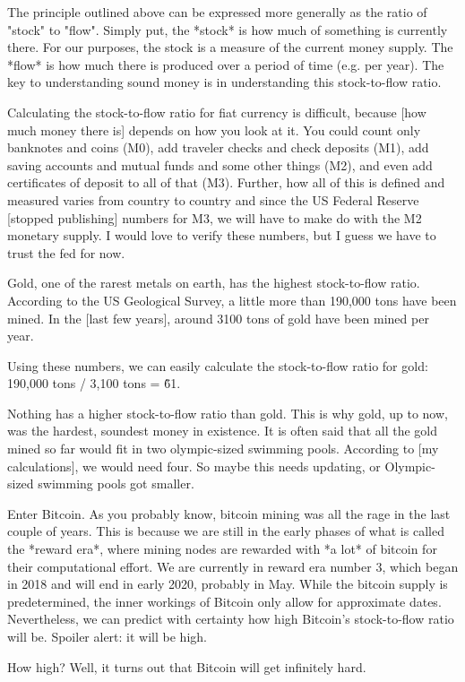 {{The principle outlined above can be expressed more generally as the
ratio of "stock" to "flow". Simply put, the *stock* is how much of
something is currently there. For our purposes, the stock is a measure
of the current money supply. The *flow* is how much there is produced
over a period of time (e.g. per year). The key to understanding sound
money is in understanding this stock-to-flow ratio.

Calculating the stock-to-flow ratio for fiat currency is difficult,
because [how much money there is] depends on how you look at it. You
could count only banknotes and coins (M0), add traveler checks and check
deposits (M1), add saving accounts and mutual funds and some other
things (M2), and even add certificates of deposit to all of that (M3).
Further, how all of this is defined and measured varies from country to
country and since the US Federal Reserve [stopped publishing] numbers
for M3, we will have to make do with the M2 monetary supply. I would
love to verify these numbers, but I guess we have to trust the fed for
now.

Gold, one of the rarest metals on earth, has the highest stock-to-flow
ratio. According to the US Geological Survey, a little more than 190,000
tons have been mined. In the [last few years], around 3100 tons of gold
have been mined per year.

Using these numbers, we can easily calculate the stock-to-flow ratio for
gold: 190,000 tons / 3,100 tons = \~61.

Nothing has a higher stock-to-flow ratio than gold. This is why gold, up
to now, was the hardest, soundest money in existence. It is often said
that all the gold mined so far would fit in two olympic-sized swimming
pools. According to [my calculations], we would need four. So maybe this
needs updating, or Olympic-sized swimming pools got smaller.

Enter Bitcoin. As you probably know, bitcoin mining was all the rage in
the last couple of years. This is because we are still in the early
phases of what is called the *reward era*, where mining nodes are
rewarded with *a lot* of bitcoin for their computational effort. We are
currently in reward era number 3, which began in 2018 and will end in
early 2020, probably in May. While the bitcoin supply is predetermined,
the inner workings of Bitcoin only allow for approximate dates.
Nevertheless, we can predict with certainty how high Bitcoin's
stock-to-flow ratio will be. Spoiler alert: it will be high.

How high? Well, it turns out that Bitcoin will get infinitely hard.

}}
